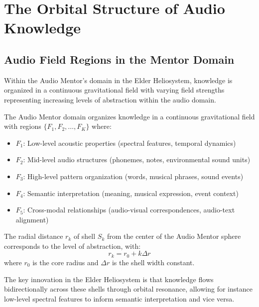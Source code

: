 \section{The Orbital Structure of Audio Knowledge}

\subsection{Audio Field Regions in the Mentor Domain}

Within the Audio Mentor's domain in the Elder Heliosystem, knowledge is organized in a continuous gravitational field with varying field strengths representing increasing levels of abstraction within the audio domain.

\begin{definition}
The Audio Mentor domain organizes knowledge in a continuous gravitational field with regions $\{F_1, F_2, \ldots, F_K\}$ where:
\begin{itemize}
    \item $F_1$: Low-level acoustic properties (spectral features, temporal dynamics)
    \item $F_2$: Mid-level audio structures (phonemes, notes, environmental sound units)
    \item $F_3$: High-level pattern organization (words, musical phrases, sound events)
    \item $F_4$: Semantic interpretation (meaning, musical expression, event context)
    \item $F_5$: Cross-modal relationships (audio-visual correspondences, audio-text alignment)
\end{itemize}
\end{definition}

\begin{proposition}
The radial distance $r_k$ of shell $S_k$ from the center of the Audio Mentor sphere corresponds to the level of abstraction, with:
\begin{equation}
r_k = r_0 + k \Delta r
\end{equation}
where $r_0$ is the core radius and $\Delta r$ is the shell width constant.
\end{proposition}

The key innovation in the Elder Heliosystem is that knowledge flows bidirectionally across these shells through orbital resonance, allowing for instance low-level spectral features to inform semantic interpretation and vice versa.

